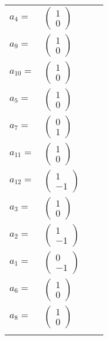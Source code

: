 \documentclass[1p]{elsarticle_modified}
\theoremstyle{definition}
\begin{document}
\begin{tabular}{m{7pt} m{180pt} m{7pt} m{180pt} }
\flushright $a_{4}=$&$\begin{pmatrix}1\\0\end{pmatrix}$ \\
\flushright $a_{9}=$&$\begin{pmatrix}1\\0\end{pmatrix}$ \\
\flushright $a_{10}=$&$\begin{pmatrix}1\\0\end{pmatrix}$ \\
\flushright $a_{5}=$&$\begin{pmatrix}1\\0\end{pmatrix}$ \\
\flushright $a_{7}=$&$\begin{pmatrix}0\\1\end{pmatrix}$ \\
\flushright $a_{11}=$&$\begin{pmatrix}1\\0\end{pmatrix}$ \\
\flushright $a_{12}=$&$\begin{pmatrix}1\\-1\end{pmatrix}$ \\
\flushright $a_{3}=$&$\begin{pmatrix}1\\0\end{pmatrix}$ \\
\flushright $a_{2}=$&$\begin{pmatrix}1\\-1\end{pmatrix}$ \\
\flushright $a_{1}=$&$\begin{pmatrix}0\\-1\end{pmatrix}$ \\
\flushright $a_{6}=$&$\begin{pmatrix}1\\0\end{pmatrix}$ \\
\flushright $a_{8}=$&$\begin{pmatrix}1\\0\end{pmatrix}$\\&\end{tabular}
\end{document}
